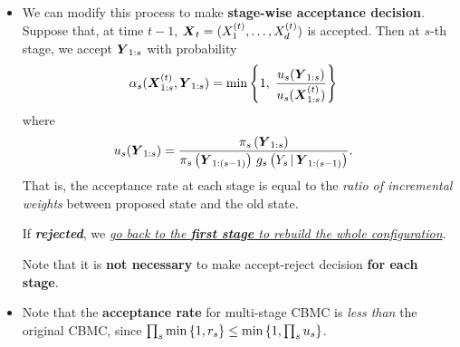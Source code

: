 \documentclass[11pt]{article}
\begin{document}
\begin{itemize}
\item We can modify this process to make \textbf{stage-wise acceptance decision}. Suppose that, at time $t-1$, $\boldsymbol{X}_{t}= (X_1^{(t)}, \ldots, X_d^{(t)})$ is accepted. Then at $s$-th stage, we accept $\boldsymbol{Y}_{1:s}$ with probability 
\begin{align}
\alpha_{s}(\boldsymbol{X}_{1:s}^{(t)}, \boldsymbol{Y}_{1:s}) &= \min\left\{1,\;\frac{u_{s}(\boldsymbol{Y}_{1:s})}{u_{s}(\boldsymbol{X}_{1:s}^{(t)})}\right\} \label{eqn: cbmc_accept_incremental_importance_weight}
\end{align} where 
\begin{align*}
u_s(\boldsymbol{Y}_{1:s}) &= \frac{\pi_s\left(\boldsymbol{Y}_{1:s}\right)}{\pi_s\left(\boldsymbol{Y}_{1:(s-1)}\right)\,g_s\left(Y_s\,|\, \boldsymbol{Y}_{1:(s-1)}\right)}.
\end{align*} That is, the acceptance rate at each stage is equal to the \emph{ratio of incremental weights} between proposed state and the old state. 

If \emph{\textbf{rejected}}, we \underline{\emph{go back to the \textbf{first stage} to rebuild the whole configuration}}.

Note that it is \textbf{not necessary} to make accept-reject decision \textbf{for each stage}.

\item Note that the \textbf{acceptance rate} for multi-stage CBMC is \emph{less than} the original CBMC, since $\prod_s \min\left\{1, r_{s}\right\} \le \min\left\{1, \prod_s u_s\right\}$.
\end{itemize}




\newpage


\end{document}
